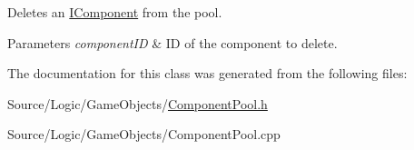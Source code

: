 Deletes an \mbox{\hyperlink{class_i_component}{I\+Component}} from the pool. 


\begin{DoxyParams}{Parameters}
{\em component\+ID} & ID of the component to delete. \\
\hline
\end{DoxyParams}


The documentation for this class was generated from the following files\+:\begin{DoxyCompactItemize}
\item 
Source/\+Logic/\+Game\+Objects/\mbox{\hyperlink{_component_pool_8h}{Component\+Pool.\+h}}\item 
Source/\+Logic/\+Game\+Objects/Component\+Pool.\+cpp\end{DoxyCompactItemize}
